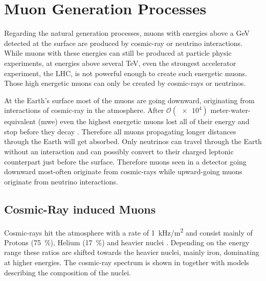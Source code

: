 \chapter{Muon Generation Processes} \label{sec:generation}

Regarding the natural generation processes, muons with energies above a GeV detected at the surface are produced by cosmic-ray or neutrino interactions.
While muons with these energies can still be produced at particle physic experiments, at energies above several TeV, even the strongest accelerator experiment, the LHC, is not powerful enough to create such energetic muons.
Those high energetic muons can only be created by cosmic-rays or neutrinos.

At the Earth's surface most of the muons are going downward, originating from interactions of cosmic-ray in the atmosphere.
After $\mathcal{O}(\num{e4})$ meter-water-equivalent (mwe) even the highest energetic muons lost all of their energy and stop before they decay \cite{PDG20}.
Therefore all muons propagating longer distances through the Earth will get absorbed.
Only neutrinos can travel through the Earth without an interaction and can possibly convert to their charged leptonic counterpart just before the surface.
Therefore muons seen in a detector going downward most-often originate from cosmic-rays while upward-going muons originate from neutrino interactions.

\section{Cosmic-Ray induced Muons}

Cosmic-rays hit the atmosphere with a rate of \SI{1}{kHz/m^2} and consist mainly of Protons (\SI{75}{\percent}), Helium (\SI{17}{\percent}) and heavier nuclei \cite{Gaisser16CR}.
Depending on the energy range these ratios are shifted towards the heavier nuclei, mainly iron, dominating at higher energies.
The cosmic-ray spectrum is shown in  together with models describing the composition of the nuclei.

